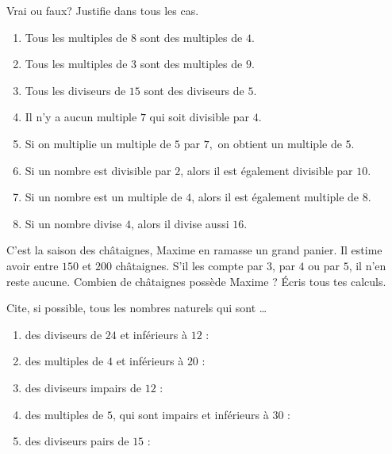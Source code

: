 \documentclass[../../syllabus_1.tex]{subfiles}
\begin{document}
\newpage
\begin{exercise}
      Vrai ou faux? Justifie dans tous les cas.
      \begin{enumerate}
            \item Tous les multiples de \(8\) sont des multiples de \(4\).\par{}
            \item Tous les multiples de \(3\) sont des multiples de \(9\).\par{}
            \item Tous les diviseurs de \(15\) sont des diviseurs de \(5\).\par{}
            \item Il n'y a aucun multiple \(7\) qui soit divisible par \(4\).\par{}
            \item Si on multiplie un multiple de \(5\) par \(7,\) on obtient un multiple de \(5\).\par{}
            \item Si un nombre est divisible par \(2\), alors il est également divisible par \(10\).\par{}
            \item Si un nombre est un multiple de \(4\), alors il est également multiple de \(8\).\par{}
            \item Si un nombre divise \(4\), alors il divise aussi \(16\).\par{}
      \end{enumerate}
\end{exercise}

\begin{exercise}
      C'est la saison des châtaignes, Maxime en ramasse un grand panier. Il estime avoir entre \(150\) et \(200\) châtaignes. S'il les compte par \(3\), par \(4\) ou par \(5\), il n'en reste aucune. Combien de châtaignes possède Maxime ? Écris tous tes calculs.
\end{exercise}
\vfill
\newpage
\begin{exercise}
      Cite, si possible, tous les nombres naturels qui sont \dots
      \begin{enumerate}
            \item des diviseurs de \(24\) et inférieurs à \(12\) :
            \item des multiples de \(4\) et inférieurs à \(20\) :
            \item des diviseurs impairs de \(12\) :
            \item des multiples de \(5\), qui sont impairs et inférieurs à \(30\) :
            \item des diviseurs pairs de \(15\) :
      \end{enumerate}
\end{exercise}
\end{document}
